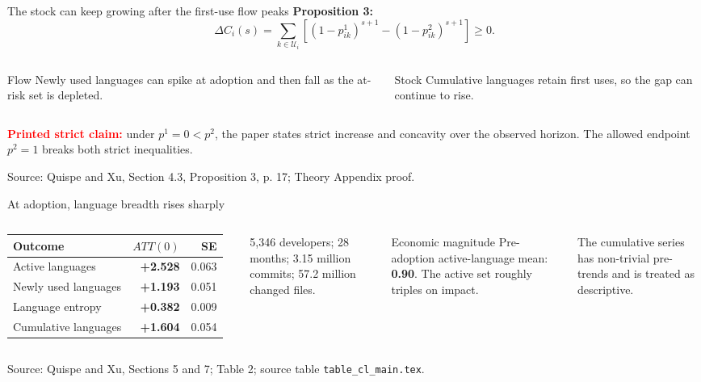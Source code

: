 \documentclass[aspectratio=169,11pt]{beamer}
\newcommand{\source}[1]{%
  \vfill\par\begingroup\color{gray!75!black}\fontsize{7}{8}\selectfont
  Source: #1\par\endgroup}
\newcommand{\warn}[1]{\textcolor{Red}{\textbf{#1}}}
\begin{document}
\begin{frame}{The stock can keep growing after the first-use flow peaks}
  \textbf{Proposition 3:}
  \[
  \Delta C_i(s)=\sum_{k\in\mathcal U_i}
  \left[(1-p^1_{ik})^{s+1}-(1-p^2_{ik})^{s+1}\right]\ge0.
  \]
  \begin{columns}[T,onlytextwidth]
      \begin{block}{Flow}
        Newly used languages can spike at adoption and then fall as the at-risk set is depleted.
      \end{block}
      \begin{block}{Stock}
        Cumulative languages retain first uses, so the gap can continue to rise.
      \end{block}
  \end{columns}
  \vspace{0.25cm}
  \warn{Printed strict claim:} under \(p^1=0<p^2\), the paper states strict increase and concavity over the observed horizon. The allowed endpoint \(p^2=1\) breaks both strict inequalities.
  \source{Quispe and Xu, Section 4.3, Proposition 3, p. 17; Theory Appendix proof.}
\end{frame}

\begin{frame}{At adoption, language breadth rises sharply}
  \begin{columns}[T,onlytextwidth]
      \renewcommand{\arraystretch}{1.28}
      \begin{tabular}{lrr}
        \toprule
        Outcome & \(ATT(0)\) & SE \\
        \midrule
        Active languages & \textbf{+2.528} & 0.063 \\
        Newly used languages & \textbf{+1.193} & 0.051 \\
        Language entropy & \textbf{+0.382} & 0.009 \\
        Cumulative languages & \textbf{+1.604} & 0.054 \\
        \bottomrule
      \end{tabular}
      \vspace{0.35cm}

      \small 5,346 developers; 28 months; 3.15 million commits; 57.2 million changed files.
      \begin{block}{Economic magnitude}
        Pre-adoption active-language mean: \textbf{0.90}. The active set roughly triples on impact.
      \end{block}
      \vspace{0.2cm}
      The cumulative series has non-trivial pre-trends and is treated as descriptive.
  \end{columns}
  \source{Quispe and Xu, Sections 5 and 7; Table 2; source table \texttt{table\_cl\_main.tex}.}
\end{frame}
\end{document}
